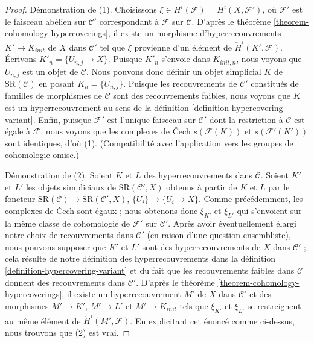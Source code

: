 \begin{proof}
\medskip\noindent
Démonstration de (1). Choisissons $\xi \in H^i(\mathcal{F}) = H^i(X, \mathcal{F}')$,
où $\mathcal{F}'$ est le faisceau abélien sur $\mathcal{C}'$ correspondant
à $\mathcal{F}$ sur $\mathcal{C}$. D'après le
théorème \ref{theorem-cohomology-hypercoverings},
il existe un morphisme d'hyperrecouvrements $K' \to K_{init}$
de $X$ dans $\mathcal{C}'$ tel que $\xi$ provienne d'un élément
de $\check{H}^i(K', \mathcal{F})$.
Écrivons $K'_n = \{U_{n, j} \to X\}$. Puisque $K'_n$ s'envoie dans
$K_{init, n}$, nous voyons que $U_{n, j}$ est un objet de $\mathcal{C}$.
Nous pouvons donc définir un objet simplicial $K$ de $\text{SR}(\mathcal{C})$
en posant $K_n = \{U_{n, j}\}$. Puisque les recouvrements de
$\mathcal{C}'$ constitués de familles de morphismes de $\mathcal{C}$
sont des recouvrements faibles, nous voyons que $K$ est un hyperrecouvrement au sens
de la définition \ref{definition-hypercovering-variant}.
Enfin, puisque $\mathcal{F}'$ est l'unique faisceau sur $\mathcal{C}'$
dont la restriction à $\mathcal{C}$ est égale à $\mathcal{F}$,
nous voyons que les complexes de {\v C}ech $s(\mathcal{F}(K))$
et $s(\mathcal{F}'(K'))$ sont identiques, d'où (1).
(Compatibilité avec l'application vers les groupes de cohomologie omise.)

\medskip\noindent
Démonstration de (2). Soient $K$ et $L$ des hyperrecouvrements dans $\mathcal{C}$.
Soient $K'$ et $L'$ les objets simpliciaux de $\text{SR}(\mathcal{C}', X)$
obtenus à partir de $K$ et $L$ par le foncteur
$\text{SR}(\mathcal{C}) \to \text{SR}(\mathcal{C}', X)$,
$\{U_i\} \mapsto \{U_i \to X\}$. Comme précédemment, les complexes de
{\v C}ech sont égaux ; nous obtenons donc $\xi_{K'}$ et
$\xi_{L'}$ qui s'envoient sur la même classe de cohomologie de $\mathcal{F}'$
sur $\mathcal{C}'$. Après avoir éventuellement élargi notre choix
de recouvrements dans $\mathcal{C}'$ (en raison d'une question ensembliste),
nous pouvons supposer que $K'$ et $L'$ sont des hyperrecouvrements de $X$ dans
$\mathcal{C}'$ ; cela résulte de notre définition des hyperrecouvrements dans la
définition \ref{definition-hypercovering-variant} et
du fait que les recouvrements faibles dans $\mathcal{C}$ donnent des recouvrements dans
$\mathcal{C}'$. D'après le
théorème \ref{theorem-cohomology-hypercoverings},
il existe un hyperrecouvrement $M'$ de $X$ dans $\mathcal{C}'$
et des morphismes $M' \to K'$, $M' \to L'$ et $M' \to K_{init}$
tels que $\xi_{K'}$ et $\xi_{L'}$ se restreignent au même élément de
$\check{H}^i(M', \mathcal{F})$. En explicitant cet énoncé comme ci-dessus,
nous trouvons que (2) est vrai.
\end{proof}





